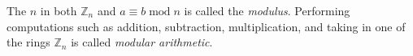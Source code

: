 \documentclass[12pt]{article}
\begin{document}
The $n$ in both ${\mathbb{Z}}_n$ and $a \equiv b \operatorname{mod} n$ is called the \emph{modulus}.  Performing computations such as addition, subtraction, multiplication, and taking  in one of the rings ${\mathbb{Z}}_n$ is called \emph{modular arithmetic}.
\end{document}
